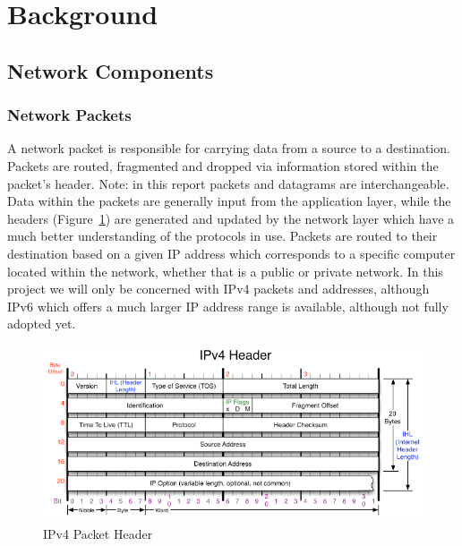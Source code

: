 \documentclass[interim_report.tex]{subfiles}
\begin{document}
\section{Background}
\subsection{Network Components}
\subsubsection{Network Packets}
A network packet is responsible for carrying data from a source to a destination. Packets are routed, fragmented and dropped via information stored within the packet's header. Note: in this report packets and datagrams are interchangeable. Data within the packets are generally input from the application layer, while the headers (Figure~\ref{fig:ipv4}) are generated and updated by the network layer which have a much better understanding of the protocols in use. Packets are routed to their destination based on a given IP address which corresponds to a specific computer located within the network, whether that is a public or private network. In this project we will only be concerned with IPv4 packets and addresses, although IPv6 which offers a much larger IP address range is available, although not fully adopted yet.

\begin{figure}[H]
	\centering
	\includegraphics[width=\textwidth]{img/ipv4header.png}
	\caption{IPv4 Packet Header \cite{ipv6}}
	\label{fig:ipv4}
\end{figure}
\end{document}
